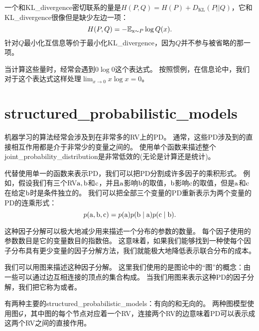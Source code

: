 
一个和\gls{KL_divergence}密切联系的量是$H(P, Q) = H(P) + D_\text{KL}(P||Q)$，它和\gls{KL_divergence}很像但是缺少左边一项：
\begin{equation}
H(P, Q) = -\mathbb{E}_{\mathrm{x}\sim P} \log Q(x).
\end{equation}
针对$Q$最小化互信息等价于最小化\gls{KL_divergence}，因为$Q$并不参与被省略的那一项。

当计算这些量时，经常会遇到$0\log 0$这个表达式。
按照惯例，在信息论中，我们对于这个表达式这样处理$\lim_{x \to 0} x\log x = 0$。


\section{\gls{structured_probabilistic_models}}
\label{sec:structured_probabilistic_models}

机器学习的算法经常会涉及到在非常多的\gls{RV}上的\gls{PD}。
通常，这些\gls{PD}涉及到的直接相互作用都是介于非常少的变量之间的。
使用单个函数来描述整个\gls{joint_probability_distribution}是非常低效的(无论是计算还是统计)。

代替使用单一的函数来表示\gls{PD}，我们可以把\gls{PD}分割成许多因子的乘积形式。
例如，假设我们有三个\gls{RV}$\mathrm{a}, \mathrm{b}$和$\mathrm{c}$，并且$\mathrm{a}$影响$\mathrm{b}$的取值，$\mathrm{b}$影响$\mathrm{c}$的取值，但是$\mathrm{a}$和$\mathrm{c}$在给定$\mathrm{b}$时是条件独立的。
我们可以把全部三个变量的\gls{PD}重新表示为两个变量的\gls{PD}的连乘形式：
\begin{equation}
p(\mathrm{a}, \mathrm{b}, \mathrm{c}) = p(\mathrm{a})p(\mathrm{b}\mid \mathrm{a})p(\mathrm{c}\mid\mathrm{b}).
\end{equation}

这种因子分解可以极大地减少用来描述一个分布的参数的数量。
每个因子使用的参数数目是它的变量数目的指数倍。
这意味着，如果我们能够找到一种使每个因子分布具有更少变量的因子分解方法，我们就能极大地降低表示联合分布的成本。

我们可以用图来描述这种因子分解。
这里我们使用的是图论中的``图''的概念：由一些可以通过边互相连接的顶点的集合构成。
当我们用图来表示这种\gls{PD}的因子分解，我们把它称为或者。

有两种主要的\gls{structured_probabilistic_models}：有向的和无向的。
两种图模型使用图$\mathcal{G}$，其中图的每个节点对应着一个\gls{RV}，连接两个\gls{RV}的边意味着\gls{PD}可以表示成这两个\gls{RV}之间的直接作用。

